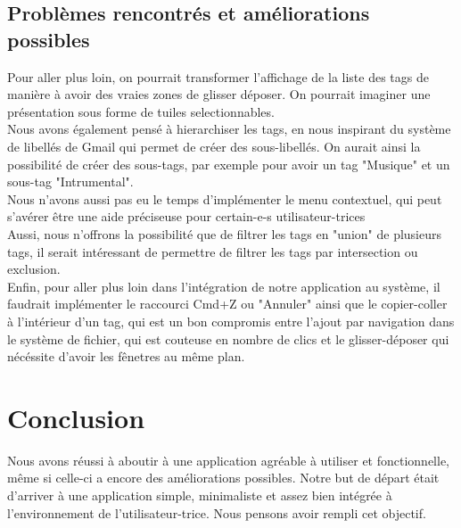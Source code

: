\documentclass{report}
\begin{document}
    \section{Problèmes rencontrés et améliorations possibles}
    Pour aller plus loin, on pourrait transformer l'affichage de la liste des tags de manière à avoir des vraies zones de glisser déposer. On pourrait imaginer une présentation sous forme de tuiles selectionnables. \\
    Nous avons également pensé à hierarchiser les tags, en nous inspirant du système de libellés de Gmail qui permet de créer des sous-libellés. On aurait ainsi la possibilité de créer des sous-tags, par exemple pour avoir un tag "Musique" et un sous-tag "Intrumental".\\
    Nous n'avons aussi pas eu le temps d'implémenter le menu contextuel, qui peut s'avérer être une aide préciseuse pour certain-e-s utilisateur-trices\\
    Aussi, nous n'offrons la possibilité que de filtrer les tags en "union" de plusieurs tags, il serait intéressant de permettre de filtrer les tags par intersection ou exclusion.\\
    Enfin, pour aller plus loin dans l'intégration de notre application au système, il faudrait implémenter le raccourci Cmd+Z ou "Annuler" ainsi que le copier-coller à l'intérieur d'un tag, qui est un bon compromis entre l'ajout par navigation dans le système de fichier, qui est couteuse en nombre de clics et le glisser-déposer qui nécéssite d'avoir les fênetres au même plan. \\

\chapter{Conclusion}
    Nous avons réussi à aboutir à une application agréable à utiliser et fonctionnelle, même si celle-ci a encore des améliorations possibles. Notre but de départ était d'arriver à une application simple, minimaliste et assez bien intégrée à l'environnement de l'utilisateur-trice. Nous pensons avoir rempli cet objectif.
\end{document}

